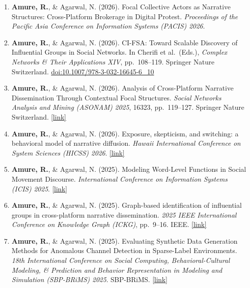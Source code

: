 \documentclass[11pt, letterpaper]{article}
\newcommand{\pubentry}[1]{%
  \item #1
}
\begin{document}
\begin{enumerate}[leftmargin=1.5em, itemsep=5pt, topsep=4pt]

  \pubentry{%
    \textbf{Amure, R.}, \& Agarwal, N. (2026).
    Focal Collective Actors as Narrative Structures: Cross-Platform Brokerage in Digital Protest.
    \textit{Proceedings of the Pacific Asia Conference on Information Systems (PACIS) 2026}.
  }

  \pubentry{%
    \textbf{Amure, R.}, \& Agarwal, N. (2026).
    CI-FSA: Toward Scalable Discovery of Influential Groups in Social Networks.
    In Cherifi et al.\ (Eds.), \textit{Complex Networks \& Their Applications XIV}, pp.\ 108--119. Springer Nature Switzerland.
    \href{https://doi.org/10.1007/978-3-032-16645-6_10}{doi:10.1007/978-3-032-16645-6\_10}
  }

  \pubentry{%
    \textbf{Amure, R.}, \& Agarwal, N. (2026).
    Analysis of Cross-Platform Narrative Dissemination Through Contextual Focal Structures.
    \textit{Social Networks Analysis and Mining (ASONAM) 2025}, 16323, pp.\ 119--127. Springer Nature Switzerland.
    \href{https://link.springer.com/chapter/10.1007/978-3-032-13821-7_11}{[link]}
  }

  \pubentry{%
    \textbf{Amure, R.}, \& Agarwal, N. (2026).
    Exposure, skepticism, and switching: a behavioral model of narrative diffusion.
    \textit{Hawaii International Conference on System Sciences (HICSS) 2026}.
    \href{https://hdl.handle.net/10125/112076}{[link]}
  }

  \pubentry{%
    \textbf{Amure, R.}, \& Agarwal, N. (2025).
    Modeling Word-Level Functions in Social Movement Discourse.
    \textit{International Conference on Information Systems (ICIS) 2025}.
    \href{https://aisel.aisnet.org/icis2025/user_behav/user_behav/30/}{[link]}
  }

  \pubentry{%
    \textbf{Amure, R.}, \& Agarwal, N. (2025).
    Graph-based identification of influential groups in cross-platform narrative dissemination.
    \textit{2025 IEEE International Conference on Knowledge Graph (ICKG)}, pp.\ 9--16. IEEE.
    \href{https://ieeexplore.ieee.org/abstract/document/11391778/}{[link]}
  }

  \pubentry{%
    \textbf{Amure, R.}, \& Agarwal, N. (2025).
    Evaluating Synthetic Data Generation Methods for Anomalous Channel Detection in Sparse-Label Environments.
    \textit{18th International Conference on Social Computing, Behavioral-Cultural Modeling, \& Prediction and Behavior Representation in Modeling and Simulation (SBP-BRiMS) 2025}. SBP-BRiMS.
    \href{https://sbp-brims.org/2025/papers/working-papers/2025_SBP-BRiMS_paper_57.pdf}{[link]}
  }


\end{enumerate}
\end{document}

